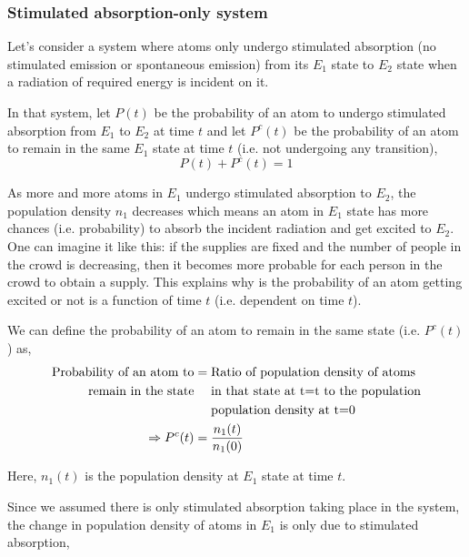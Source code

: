 \documentclass[12pt]{article}
\begin{document}
\subsubsection{Stimulated absorption-only system}

Let's consider a system where atoms only undergo stimulated absorption (no stimulated emission or spontaneous emission) from its $E_{1}$ state to $E_{2}$ state when a radiation of required energy is incident on it. \vspace{.2cm}

In that system, let $P(t)$ be the probability of an atom to undergo stimulated absorption from $E_{1}$ to $E_{2}$ at time $t$ and let $P^c(t)$ be the probability of an atom to remain in the same $E_{1}$ state at time $t$ (i.e. not undergoing any transition), \vspace{.2cm}
\begin{equation}
    P(t) + P^c(t) = 1
\end{equation}

As more and more atoms in $E_{1}$ undergo stimulated absorption to $E_{2}$, the population density $n_{1}$ decreases which means an atom in $E_{1}$ state has more chances (i.e. probability) to absorb the incident radiation and get excited to $E_{2}$. One can imagine it like this: if the supplies are fixed and the number of people in the crowd is decreasing, then it becomes more probable for each person in the crowd to obtain a supply. This explains why is the probability of an atom getting excited or not is a function of time $t$ (i.e. dependent on time $t$). \vspace{.2cm}

We can define the probability of an atom to remain in the same state (i.e. $P^c(t)$) as,
\begin{align}
    \text{Probability of an atom to} & = \text{Ratio of population density of atoms} \notag \\
    \text{remain in the state} & \quad \text{  in that state at t=t to the population} \notag \\
    & \quad \text{  population density at t=0} \notag \\
    \Rightarrow P^c(t) & = \frac{n_{1}(t)}{n_{1}(0)} 
\end{align}

Here, $n_{1}(t)$ is the population density at $E_{1}$ state at time $t$. \vspace{.2cm}

Since we assumed there is only stimulated absorption taking place in the system, the change in population density of atoms in $E_{1}$ is only due to stimulated absorption,
\end{document}
